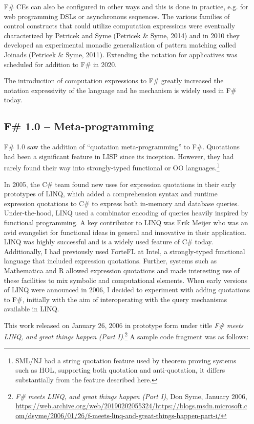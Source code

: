 \documentclass[acmsmall]{acmart}\settopmatter{}
\begin{document}
F\# CEs can also be configured in other ways and this is done in practice, e.g. for web programming DSLs or asynchronous sequences.
The various families of control constructs that could utilize computation expressions were eventually characterized by Petricek
and Syme (Petricek \& Syme, 2014) and in 2010 they developed an experimental monadic generalization of pattern matching called Joinads (Petricek \& Syme, 2011).
Extending the notation for applicatives was scheduled for addition to F\# in 2020.

The introduction of computation expressions to F\# greatly increased the notation expressivity of the language
and he mechanism is widely used in F\# today.

\subsection*{F\# 1.0 – Meta-programming}

F\# 1.0 saw the addition of “quotation meta-programming” to F\#.  Quotations had been a significant feature in LISP since its inception. However, they had rarely 
found their way into strongly-typed functional or OO languages.\footnote{SML/NJ had a string quotation feature used by theorem proving systems such as HOL, supporting both quotation and anti-quotation, it differs substantially from the feature described here.}


In 2005, the C\# team found new uses for expression quotations in their early prototypes of LINQ, which added a comprehension syntax and runtime expression quotations to C\# to express both in-memory and database queries. Under-the-hood, LINQ used a combinator encoding of queries heavily inspired by functional programming. A key contributor to LINQ was Erik Meijer who was an avid evangelist for functional ideas in general and innovative in their application. LINQ was highly successful and is a widely used feature of C\# today.  Additionally, I had previously used ForteFL at Intel, a strongly-typed functional language that included expression quotations.  Further, systems such as Mathematica and R allowed expression quotations and made interesting use of these facilities to mix symbolic and computational elements. When early versions of LINQ were announced in 2006, I decided to experiment with adding quotations to F\#, initially with the aim of interoperating with the query mechanisms available in LINQ.  

This work released on January 26, 2006 in prototype form under title \textit{F\# meets LINQ, and great things happen (Part I)}.\footnote{\textit{F\# meets LINQ, and great things happen (Part I)}, Don Syme, January 2006, \url{https://web.archive.org/web/20190202055324/https://blogs.msdn.microsoft.com/dsyme/2006/01/26/f-meets-linq-and-great-things-happen-part-i/}}   A sample code fragment was as follows:
\end{document}

